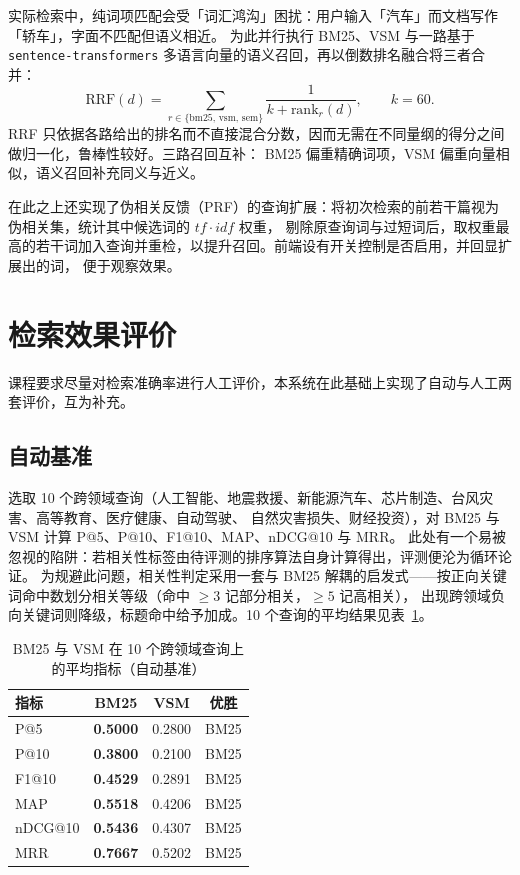 \documentclass[11pt,a4paper]{ctexart}
\begin{document}
实际检索中，纯词项匹配会受「词汇鸿沟」困扰：用户输入「汽车」而文档写作「轿车」，字面不匹配但语义相近。
为此并行执行 BM25、VSM 与一路基于 \texttt{sentence-transformers} 多语言向量的语义召回，再以倒数排名融合将三者合并：
\begin{equation}
\text{RRF}(d)=\sum_{r\in\{\text{bm25, vsm, sem}\}}\frac{1}{k+\text{rank}_r(d)},\qquad k=60 .
\end{equation}
RRF 只依据各路给出的排名而不直接混合分数，因而无需在不同量纲的得分之间做归一化，鲁棒性较好。三路召回互补：
BM25 偏重精确词项，VSM 偏重向量相似，语义召回补充同义与近义。

在此之上还实现了伪相关反馈（PRF）的查询扩展：将初次检索的前若干篇视为伪相关集，统计其中候选词的 $tf\cdot idf$ 权重，
剔除原查询词与过短词后，取权重最高的若干词加入查询并重检，以提升召回。前端设有开关控制是否启用，并回显扩展出的词，
便于观察效果。

\section{检索效果评价}

课程要求尽量对检索准确率进行人工评价，本系统在此基础上实现了自动与人工两套评价，互为补充。

\subsection{自动基准}

选取 10 个跨领域查询（人工智能、地震救援、新能源汽车、芯片制造、台风灾害、高等教育、医疗健康、自动驾驶、
自然灾害损失、财经投资），对 BM25 与 VSM 计算 P@5、P@10、F1@10、MAP、nDCG@10 与 MRR。
此处有一个易被忽视的陷阱：若相关性标签由待评测的排序算法自身计算得出，评测便沦为循环论证。
为规避此问题，相关性判定采用一套与 BM25 解耦的启发式——按正向关键词命中数划分相关等级（命中 $\ge 3$ 记部分相关，$\ge 5$ 记高相关），
出现跨领域负向关键词则降级，标题命中给予加成。10 个查询的平均结果见表~\ref{tab:bench}。

\begin{table}[ht]
\centering
\caption{BM25 与 VSM 在 10 个跨领域查询上的平均指标（自动基准）}
\label{tab:bench}
\begin{tabular}{lccc}
\toprule
指标 & BM25 & VSM & 优胜 \\
\midrule
P@5      & \textbf{0.5000} & 0.2800 & BM25 \\
P@10     & \textbf{0.3800} & 0.2100 & BM25 \\
F1@10    & \textbf{0.4529} & 0.2891 & BM25 \\
MAP      & \textbf{0.5518} & 0.4206 & BM25 \\
nDCG@10  & \textbf{0.5436} & 0.4307 & BM25 \\
MRR      & \textbf{0.7667} & 0.5202 & BM25 \\
\bottomrule
\end{tabular}
\end{table}
\end{document}
